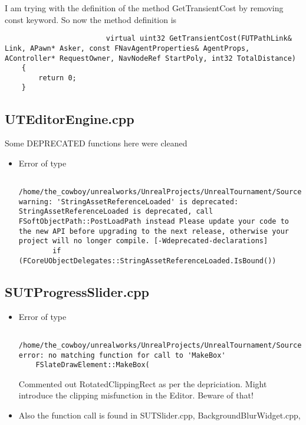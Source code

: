 \documentclass{article}
\begin{document}
\begin{itemize}
\begin{lstlisting}
                      \end{lstlisting}
                      I am trying with the definition of the method GetTransientCost by removing const keyword.  So now the method definition is
\lstset{language=c++}
                      \begin{lstlisting}
                        virtual uint32 GetTransientCost(FUTPathLink& Link, APawn* Asker, const FNavAgentProperties& AgentProps, AController* RequestOwner, NavNodeRef StartPoly, int32 TotalDistance)
	{
		return 0;
	}
                      \end{lstlisting}
            \end{itemize}
            \subsection{UTEditorEngine.cpp}
            Some DEPRECATED functions here were cleaned
            \begin{itemize}
            \item Error of type
              \lstset{language=c++}
              \begin{lstlisting}
               /home/the_cowboy/unrealworks/UnrealProjects/UnrealTournament/Source/UnrealTournamentEditor/Private/UTEditorEngine.cpp:9:29: warning: 'StringAssetReferenceLoaded' is deprecated: StringAssetReferenceLoaded is deprecated, call FSoftObjectPath::PostLoadPath instead Please update your code to the new API before upgrading to the next release, otherwise your project will no longer compile. [-Wdeprecated-declarations]
        if (FCoreUObjectDelegates::StringAssetReferenceLoaded.IsBound())
              \end{lstlisting}
            \end{itemize}
            \subsection{SUTProgressSlider.cpp}
            \begin{itemize}
            \item Error of type
              \lstset{language=c++}
              \begin{lstlisting}
                /home/the_cowboy/unrealworks/UnrealProjects/UnrealTournament/Source/UnrealTournament/Private/Slate/Widgets/SUTProgressSlider.cpp:98:5: error: no matching function for call to 'MakeBox'
    FSlateDrawElement::MakeBox(
  \end{lstlisting}
  Commented out RotatedClippingRect as per the depriciation. Might introduce the clipping misfunction in the Editor.  Beware of that!
  \item Also the function call is found in {\color{filecolor}SUTSlider.cpp}, {\color{filecolor} BackgroundBlurWidget.cpp},
\end{itemize}
\end{document}

